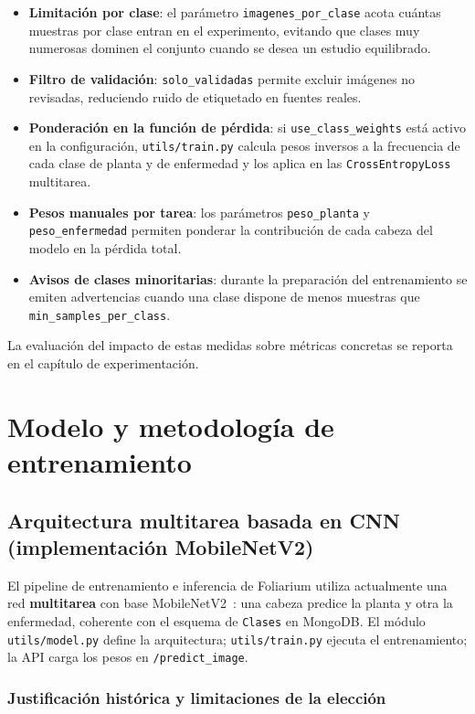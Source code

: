 \documentclass[11pt,spanish,listoffigures,listoftables]{tfgetsinf}
\begin{document}
\begin{itemize}
    \item \textbf{Limitación por clase}: el parámetro \texttt{imagenes\_por\_clase} acota cuántas muestras por clase entran en el experimento, evitando que clases muy numerosas dominen el conjunto cuando se desea un estudio equilibrado.
    \item \textbf{Filtro de validación}: \texttt{solo\_validadas} permite excluir imágenes no revisadas, reduciendo ruido de etiquetado en fuentes reales.
    \item \textbf{Ponderación en la función de pérdida}: si \texttt{use\_class\_weights} está activo en la configuración, \texttt{utils/train.py} calcula pesos inversos a la frecuencia de cada clase de planta y de enfermedad y los aplica en las \texttt{CrossEntropyLoss} multitarea.
    \item \textbf{Pesos manuales por tarea}: los parámetros \texttt{peso\_planta} y \texttt{peso\_enfermedad} permiten ponderar la contribución de cada cabeza del modelo en la pérdida total.
    \item \textbf{Avisos de clases minoritarias}: durante la preparación del entrenamiento se emiten advertencias cuando una clase dispone de menos muestras que \texttt{min\_samples\_per\_class}.
\end{itemize}

La evaluación del impacto de estas medidas sobre métricas concretas se reporta en el capítulo de experimentación.

\chapter{Modelo y metodología de entrenamiento}

\section{Arquitectura multitarea basada en CNN (implementación MobileNetV2)}

El pipeline de entrenamiento e inferencia de Foliarium utiliza actualmente una red \textbf{multitarea} con base MobileNetV2~\cite{mobilenetv2}: una cabeza predice la planta y otra la enfermedad, coherente con el esquema de \texttt{Clases} en MongoDB. El módulo \texttt{utils/model.py} define la arquitectura; \texttt{utils/train.py} ejecuta el entrenamiento; la API carga los pesos en \texttt{/predict\_image}.

\subsection{Justificación histórica y limitaciones de la elección}
\end{document}
